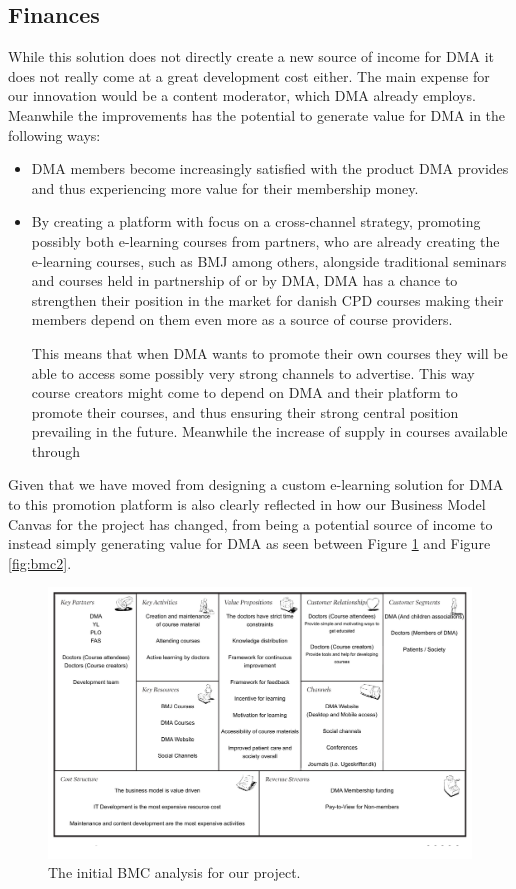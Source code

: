 \subsection{Finances}
\label{sec:finances}
While this solution does not directly create a new source of income for DMA it does not really come at a great development cost either. The main expense for our innovation would be a content moderator, which DMA already employs. Meanwhile the improvements has the potential to generate value for DMA in the following ways:

\begin{itemize}
\item DMA members become increasingly satisfied with the product DMA provides and thus experiencing more value for their membership money.
\item By creating a platform with focus on a cross-channel strategy, promoting possibly both e-learning courses from partners, who are already creating the e-learning courses, such as BMJ among others, alongside traditional seminars and courses held in partnership of or by DMA, DMA has a chance to strengthen their position in the market for danish CPD courses making their members depend on them even more as a source of course providers.

This means that when DMA wants to promote their own courses they will be able to access some possibly very strong channels to advertise. This way course creators might come to depend on DMA and their platform to promote their courses, and thus ensuring their strong central position prevailing in the future. Meanwhile the increase of supply in courses available through
\end{itemize}

Given that we have moved from designing a custom e-learning solution for DMA to this promotion platform is also clearly reflected in how our Business Model Canvas for the project has changed, from being a potential source of income to instead simply generating value for DMA as seen between Figure \ref{fig:bmc1} and Figure \ref{fig:bmc2}.


\begin{figure}[h!]
 \begin{center}
  \includegraphics[width=1\textwidth]{figures/Business-Model-Canvas-v1.pdf}
  \caption{The initial BMC analysis for our project.\label{fig:bmc1}}
 \end{center}
\end{figure}

